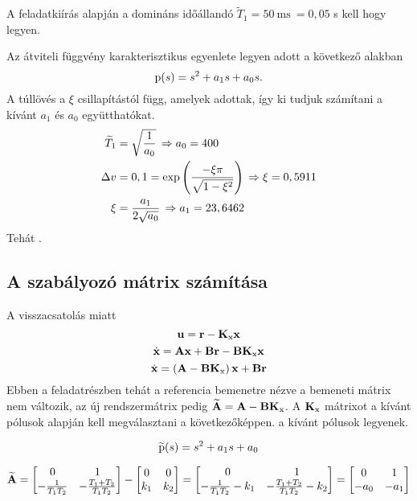 A feladatkiírás alapján a domináns időállandó $\widetilde{T}_1=50~\text{ms}~=0,05$ s
kell hogy legyen.

Az átviteli függvény karakterisztikus egyenlete legyen adott a következő alakban
\begin{equation}
	\mathrm{p}(s) = s^2 + a_1 s + a_0 s.
\end{equation}
A túllövés a $\xi$ csillapítástól függ, amelyek adottak, így ki tudjuk számítani a
kívánt $a_1$ és $a_0$ együtthatókat.
\begin{align}
	\widetilde{T}_1 &= \sqrt{\frac{1}{a_0}}\,\Rightarrow a_0 = 400\\
	\Delta v        &= 0,1 = \operatorname{exp}\left(\frac{-\xi\pi}{\sqrt{1-\xi^2}} \right)
	\,\Rightarrow \xi = 0,5911\\
	\xi             &= \frac{a_1}{2\sqrt{a_0}}\,\Rightarrow a_1 = 23,6462
\end{align}
%
Tehát .



\subsection{A szabályozó mátrix számítása}


A visszacsatolás miatt
\begin{equation}
	\boldsymbol{\mathrm{u}} = \boldsymbol{\mathrm{r}} - \boldsymbol{\mathrm{K}}_\text{x}\boldsymbol{\mathrm{x}}
\end{equation}
\begin{equation}
	\dot{\boldsymbol{\mathrm{x}}} = \boldsymbol{\mathrm{A}}\boldsymbol{\mathrm{x}} + \boldsymbol{\mathrm{B}}\boldsymbol{\mathrm{r}} - \boldsymbol{\mathrm{B}}\boldsymbol{\mathrm{K}}_\text{x}\boldsymbol{\mathrm{x}}
\end{equation}
\begin{equation}
	\dot{\boldsymbol{\mathrm{x}}} = \left(\boldsymbol{\mathrm{A}}-\boldsymbol{\mathrm{B}}\boldsymbol{\mathrm{K}}_\text{x}\right)\boldsymbol{\mathrm{x}} + \boldsymbol{\mathrm{B}}\boldsymbol{\mathrm{r}}
\end{equation}
Ebben a feladatrészben  tehát a referencia bemenetre nézve
a bemeneti mátrix nem változik, az új rendszermátrix pedig $\widetilde{\boldsymbol{\mathrm{A}}} = \boldsymbol{\mathrm{A}}-\boldsymbol{\mathrm{B}}\boldsymbol{\mathrm{K}}_\text{x}$.
A $\boldsymbol{\mathrm{K}}_\text{x}$ mátrixot a kívánt pólusok alapján kell megválasztani a következőképpen.
a kívánt pólusok legyenek.

\begin{equation}
	\widetilde{\mathrm{p}}(s) = s^2 + a_1s + a_0
\end{equation}

\begin{equation}
	\widetilde{\boldsymbol{\mathrm{A}}} = \begin{bmatrix}0&1\\-\frac{1}{T_1T_2}&-\frac{T_1+T_2}{T_1T_2}\end{bmatrix} - 
	\begin{bmatrix}0&0\\k_1&k_2\end{bmatrix} = \begin{bmatrix}0&1\\-\frac{1}{T_1T_2}-k_1&-\frac{T_1+T_2}{T_1T_2}-k_2\end{bmatrix} = 
	\begin{bmatrix}0&1\\ -a_0& -a_1\end{bmatrix}
\end{equation}

